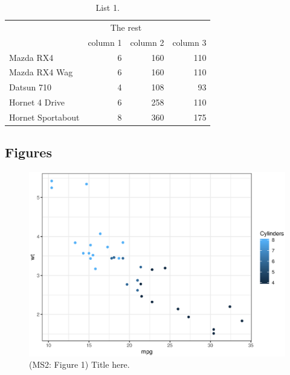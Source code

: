 \documentclass[12pt,report]{uncdissertation}
\newcommand{\blandscape}{\begin{landscape}}
\newcommand{\elandscape}{\end{landscape}}
\begin{document}
\singlespace

\begin{longtable}{lrrr}
\caption{\label{tab:unnamed-chunk-11}List 1.}\\
\toprule
\multicolumn{1}{c}{ } & \multicolumn{2}{c}{The rest} \\
\cmidrule(l{3pt}r{3pt}){2-3}
  & column 1 & column 2 & column 3\\
\midrule
Mazda RX4 & 6 & 160 & 110\\
Mazda RX4 Wag & 6 & 160 & 110\\
Datsun 710 & 4 & 108 & 93\\
Hornet 4 Drive & 6 & 258 & 110\\
Hornet Sportabout & 8 & 360 & 175\\
\bottomrule
\end{longtable}

\clearpage
\newpage

\blandscape

\hypertarget{figures-1}{%
\section{Figures}\label{figures-1}}

\centering

\begin{figure}[H]
\centering
\caption{(MS2: Figure 1) Title here.}
\includegraphics{includes/figures/fig2.eps}
\end{figure}

\elandscape

\setlength{\parindent}{-0.2in}
\setlength{\leftskip}{0.2in}
\setlength{\parskip}{8pt}
\end{document}
